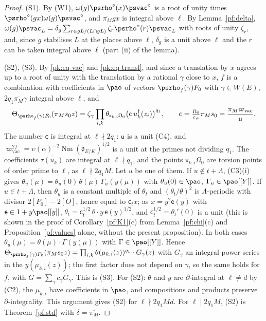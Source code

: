\documentclass[10pt]{amsart}
\theoremstyle{definition}
\theoremstyle{remark}
\providecommand{\auNm}{\operatorname{Nm}}
\providecommand{\aubar}[1]{\overline{#1}}
\begin{document}
\begin{proof}
(S1). By (W1), $\omega(g)\psrho^\circ(x)\psvac^\circ$ is a root of unity times $\psrho^\circ(gx)
\omega(g)\psvac^\circ$, and $\aubar{\pi_M}gx$ is integral above $\ell$. By Lemma~\ref{pf:delta},
$\omega(g)\psvac_L=\delta_g\sum_{r\in gL/(L\cap gL)}\zeta_r\psrho^\circ(r)\psvac_L$ with roots of
unity $\zeta_r$, and, since $g$ stabilises $L$ at the places above $\ell$, $\delta_g$ is a unit above
$\ell$ and the $r$ can be taken integral above $\ell$ (part (ii) of the lemma).

(S2), (S3). By \eqref{pk:eq-vac} and \eqref{pk:eq-transl}, and since a translation by $x$ agrees
up to a root of unity with the translation by a rational $\gamma$ close to $x$, $f$ is a
combination with coefficients in $\pao$ of vectors $\psrho_f(\gamma)F_0$ with $\gamma\in W(E)$,
$2q_1\aubar{\pi_M}\gamma$ integral above $\ell$, and
\[
\Theta_{\psrho_f(\gamma)F_0}(\pi_Ms_0z)=\zeta_\gamma\prod_{i,k}\theta_{\mathsf x_{k,i}\Omega_0}\bigl(
\mathsf c\,u_k^\dagger(z_i)\bigr)^{q_1},\qquad\mathsf c=\tfrac{\Omega_0}{c_\psi}\pi_Ms_0=
\frac{\pi_M\varpi_{\mathrm{vac}}}{\mathsf u}.
\]
The number $\mathsf c$ is integral at $\ell\nmid2q_1$: $\mathsf u$ is a unit (C4), and
$\varpi_{\mathrm{vac}}^{2f}=\upsilon(\alpha)^{-2}\auNm(\mathfrak d_{E/K})^{1/2}$ is a unit at the
primes not dividing $q_1$. The coefficients $\aubar{\tau(u_k)}$ are integral at $\ell\nmid q_1$,
and the points $\mathsf x_{k,i}\Omega_0$ are torsion points of order prime to $\ell$, as
$\ell\nmid2q_1M$. Let $u$ be one of them. If $u\notin t+\Lambda$, (C3)(i) gives
$\theta_u(\mu)=\theta_u(0)\,\theta(\mu)\,\Gamma_u(y(\mu))$ with $\theta_u(0)\in\pao$,
$\Gamma_u\in\pao[[Y]]$. If $u\in t+\Lambda$, then $\theta_u$ is a constant multiple of $\theta_t$
and $(\theta_t/\theta)^2$ is $\Lambda$-periodic with divisor $2[P_0]-2[O]$, hence equal to $\mathsf
c_tx$; as $x=y^2\mathsf e(y)$ with $\mathsf e\in1+y\pao[[y]]$, $\theta_t=\mathsf c_t^{1/2}\,\theta
\cdot y\,\mathsf e(y)^{1/2}$, and $\mathsf c_t^{1/2}=\theta_t'(0)$ is a unit (this is shown in the proof of
Corollary~\ref{pf:K1}(c) from Lemma~\ref{pf:chi}(c) and Proposition~\ref{pf:values} alone, without the present proposition). In both cases $\theta_u(\mu)=\theta(\mu)\cdot\Gamma(y(\mu))$ with
$\Gamma\in\pao[[Y]]$. Hence $\Theta_{\psrho_f(\gamma)F_0}(\pi_Ms_0z)=\prod_{i,k}\theta(\mu_{k,i}(z))^{
q_1}\cdot G_\gamma(z)$ with $G_\gamma$ an integral power series in the $y(\mu_{k,i}(z))$; the first
factor does not depend on $\gamma$, so the same holds for $f$, with $G=\sum_\gamma c_\gamma
G_\gamma$. This is (S3). For (S2): $\theta$ and $y$ are $\partial$-integral at $\ell\ne d$ by (C2),
the $\mu_{k,i}$ have coefficients in $\pao$, and compositions and products preserve
$\partial$-integrality. This argument gives (S2) for $\ell\nmid2q_1Md$. For $\ell\mid2q_1M$, (S2) is Theorem~\ref{pf:std} with
$\delta=\aubar{\pi_M}$.
\end{proof}
\end{document}
